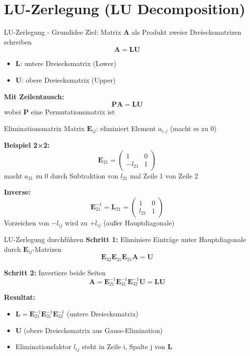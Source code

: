 \documentclass[a4paper, fontsize=7pt]{scrartcl}
\begin{document}
\section{LU-Zerlegung (LU Decomposition)}

\begin{mainbox}{LU-Zerlegung - Grundidee}
Ziel: Matrix $\mathbf{A}$ als Produkt zweier Dreiecksmatrizen schreiben
$$\mathbf{A} = \mathbf{LU}$$

\begin{itemize}
    \item $\mathbf{L}$: untere Dreiecksmatrix (Lower)
    \item $\mathbf{U}$: obere Dreiecksmatrix (Upper)
\end{itemize}

\textbf{Mit Zeilentausch:}
$$\mathbf{PA} = \mathbf{LU}$$
wobei $\mathbf{P}$ eine Permutationsmatrix ist
\end{mainbox}

\begin{mainbox}{Eliminationsmatrix}
Matrix $\mathbf{E}_{ij}$: eliminiert Element $a_{i,j}$ (macht es zu 0)

\textbf{Beispiel 2×2:}
$$\mathbf{E}_{21} = \begin{pmatrix} 1 & 0 \\ -l_{21} & 1 \end{pmatrix}$$
macht $a_{21}$ zu 0 durch Subtraktion von $l_{21}$ mal Zeile 1 von Zeile 2

\textbf{Inverse:}
$$\mathbf{E}_{21}^{-1} = \mathbf{L}_{21} = \begin{pmatrix} 1 & 0 \\ l_{21} & 1 \end{pmatrix}$$
Vorzeichen von $-l_{ij}$ wird zu $+l_{ij}$ (außer Hauptdiagonale)
\end{mainbox}

\begin{mainbox}{LU-Zerlegung durchführen}
\textbf{Schritt 1:} Eliminiere Einträge unter Hauptdiagonale durch $\mathbf{E}_{ij}$-Matrizen
$$\mathbf{E}_{32}\mathbf{E}_{31}\mathbf{E}_{21}\mathbf{A} = \mathbf{U}$$

\textbf{Schritt 2:} Invertiere beide Seiten
$$\mathbf{A} = \mathbf{E}_{21}^{-1}\mathbf{E}_{31}^{-1}\mathbf{E}_{32}^{-1}\mathbf{U} = \mathbf{LU}$$

\textbf{Resultat:}
\begin{itemize}
    \item $\mathbf{L} = \mathbf{E}_{21}^{-1}\mathbf{E}_{31}^{-1}\mathbf{E}_{32}^{-1}$ (untere Dreiecksmatrix)
    \item $\mathbf{U}$ (obere Dreiecksmatrix aus Gauss-Elimination)
    \item Eliminationsfaktor $l_{ij}$ steht in Zeile i, Spalte j von $\mathbf{L}$
\end{itemize}
\end{mainbox}
\end{document}
